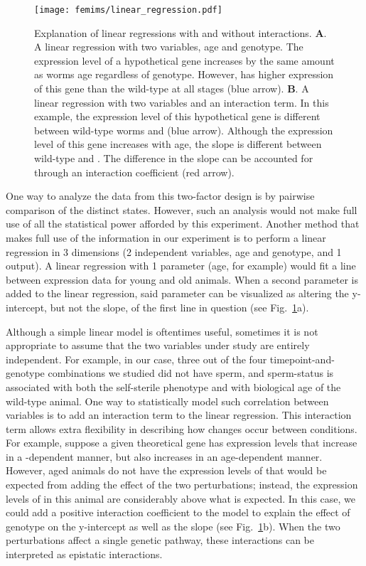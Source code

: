 \begin{figure}[htbp]
  \renewcommand{\familydefault}{\sfdefault}\normalfont{}
  \centering
  \texttt{[image: femims/linear\_regression.pdf]}
  \caption{
    Explanation of linear regressions with and without interactions.
    \textbf{A}. A linear regression with two variables, age and genotype. The
    expression level of a hypothetical gene increases by the same amount as
    worms age regardless of genotype. However, \fog{} has higher expression
    of this gene than the wild-type at all stages (blue arrow). \textbf{B}. A
    linear regression with two variables and an interaction term. In this
    example, the expression level of this hypothetical gene is different between
    wild-type worms and \fog{} (blue arrow). Although the expression level of
    this gene increases with age, the slope is different between wild-type and
    \fog{}. The difference in the slope can be accounted for through an
    interaction coefficient (red arrow).
  }
\label{fig:linear_reg}
\end{figure}

One way to analyze the data from this two-factor design is by pairwise
comparison of the distinct states. However, such an analysis would not make full
use of all the statistical power afforded by this experiment. Another method
that makes full use of the information in our experiment is to perform a linear
regression in 3 dimensions (2 independent variables, age and genotype, and 1
output). A linear regression with 1 parameter (age, for example) would fit a
line between expression data for young and old animals. When a second parameter
is added to the linear regression, said parameter can be visualized as altering
the y-intercept, but not the slope, of the first line in question (see
Fig.~\ref{fig:linear_reg}a).

Although a simple linear model is oftentimes useful, sometimes it is not
appropriate to assume that the two variables under study are entirely
independent. For example, in our case, three out of the four
timepoint-and-genotype combinations we studied did not have sperm, and
sperm-status is associated with both the \fog{} self-sterile phenotype and with
biological age of the wild-type animal. One way to statistically model such
correlation between variables is to add an interaction term to the linear
regression. This interaction term allows extra flexibility in describing how
changes occur between conditions. For example, suppose a given theoretical gene
 has expression levels that increase in a -dependent manner,
but also increases in an age-dependent manner. However, aged \fog{} animals do
not have the expression levels of  that would be expected from adding
the effect of the two perturbations; instead, the expression levels of 
in this animal are considerably above what is expected. In this case, we could
add a positive interaction coefficient to the model to explain the effect of
genotype on the y-intercept as well as the slope (see
Fig.~\ref{fig:linear_reg}b). When the two perturbations affect a single genetic
pathway, these interactions can be interpreted as epistatic interactions.

